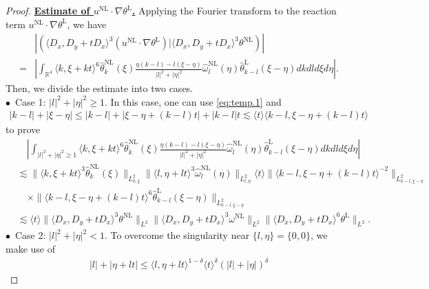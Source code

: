 \documentclass[reqno, 12pt]{amsart} %
\theoremstyle{plain} %
\theoremstyle{definition}
\theoremstyle{remark}
\numberwithin{equation}{section} %
\begin{document}
\begin{proof}
		
		\underline{\bf Estimate of $u^{\mathrm{NL}} \cdot \nabla \theta^{\mathrm{L}}$.}
		Applying the Fourier transform to the reaction term $u^{\mathrm{NL}} \cdot \nabla \theta^{\mathrm{L}}$, we have
		$$
		\begin{aligned}
			& \left|\left(\langle D_x, D_y+t D_x\rangle^3(u^{\mathrm{NL}} \cdot \nabla \theta^{\mathrm{L}}) \big| \langle D_x, D_y+t D_x\rangle^3 \theta^{\mathrm{NL}}\right)\right| \\
			= & \left|\int_{\mathbb{R}^4}\langle k, \xi+k t\rangle^6 \hat{\theta}_k^{\mathrm{NL}}(\xi) \frac{\eta(k-l)-l(\xi-\eta)}{|l|^2+|\eta|^2} \hat{\omega}_l^{\mathrm{NL}}(\eta) \hat{\theta}_{k-l}^{\mathrm{L}}(\xi-\eta) d k d l d \xi d \eta\right|.
		\end{aligned}
		$$
		Then, we divide the estimate into two cases.\\
		$\bullet$~Case 1: $|l|^2+|\eta|^2 \geq 1$. In this case, one can use \eqref{eq:temp.1} and
		\begin{align} \label{eq:est of k-l + xi - eta}
			|k-l|+|\xi-\eta| \leq|k-l|+|\xi-\eta + (k-l) t|+|k-l| t \lesssim\langle t\rangle\langle k-l, \xi-\eta+(k-l) t\rangle
		\end{align}
		to prove
		$$
		\begin{aligned}
			& \quad\left|\int_{|l|^2+|\eta|^2 \geq 1}\langle k, \xi+k t\rangle^6 \hat{\theta}_k^{\mathrm{NL}}(\xi) \frac{\eta(k-l)-l(\xi-\eta)}{|l|^2+|\eta|^2} \hat{\omega}_l^{\mathrm{NL}}(\eta) \hat{\theta}_{k-l}^{\mathrm{L}}(\xi-\eta) d k d l d \xi d \eta\right| \\
			& \lesssim\|\langle k, \xi+k t\rangle^3 \hat{\theta}_k^{\mathrm{NL}}(\xi)\|_{L_{k, \xi}^2}\|\langle l, \eta+l t\rangle^3 \hat{\omega}_l^{\mathrm{NL}}(\eta)\|_{L_{l, \eta}^2}\langle t\rangle\|\langle k-l, \xi-\eta+(k-l) t\rangle^{-2}\|_{L_{k-l, \xi-\eta}^2} \\
			& \quad \times\|\langle k-l, \xi-\eta+(k-l) t\rangle^6 \hat{\theta}_{k-l}^{\mathrm{L}}(\xi-\eta)\|_{L_{k-l, \xi-\eta}^2} \\
			& \lesssim\langle t\rangle   \|\langle D_x, D_y+t D_x\rangle^3 \theta^{\mathrm{NL}}\|_{L^2}  \|\langle D_x, D_y+t D_x\rangle^3 \omega^{\mathrm{NL}}\|_{L^2}     \|\langle D_x, D_y+t D_x\rangle^6 \theta^{\mathrm{L}}\|_{L^2}.
		\end{aligned}
		$$
		$\bullet$~Case 2: $|l|^2+|\eta|^2<1$. To overcome the singularity near $\{l, \eta\}=\{0,0\}$, we make use of \begin{align} \label{eq:est of l+eta l t}
			|l|+|\eta+l t| \leq  \langle l, \eta+l t\rangle^{1-\delta}\langle t\rangle^\delta(|l|+|\eta|)^\delta

\end{align}
\end{proof}
\end{document}
